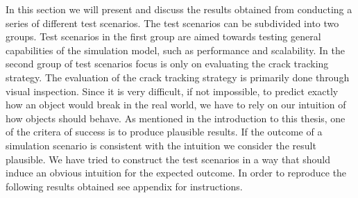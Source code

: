 
In this section we will present and discuss the results obtained from
conducting a series of different test scenarios. 
The test scenarios can be subdivided into two groups. Test
scenarios in the first group are aimed towards testing general
capabilities of the simulation model, such as performance and
scalability. In the second group of test 
scenarios focus is only on evaluating the crack tracking strategy.
The evaluation of the crack tracking strategy is primarily done
through visual inspection. Since it is very
difficult, if not impossible, to predict exactly how an
object would break in the real world, we have to rely
on our intuition of how objects should behave. As
mentioned in the introduction to this thesis, one of the critera of
success is to produce plausible results. If the outcome of a
simulation scenario is consistent with the intuition we consider the result
plausible. We have tried to construct the test scenarios in a way that
should induce an obvious intuition for the expected outcome.
In order to reproduce the following results obtained see appendix
 for instructions.

